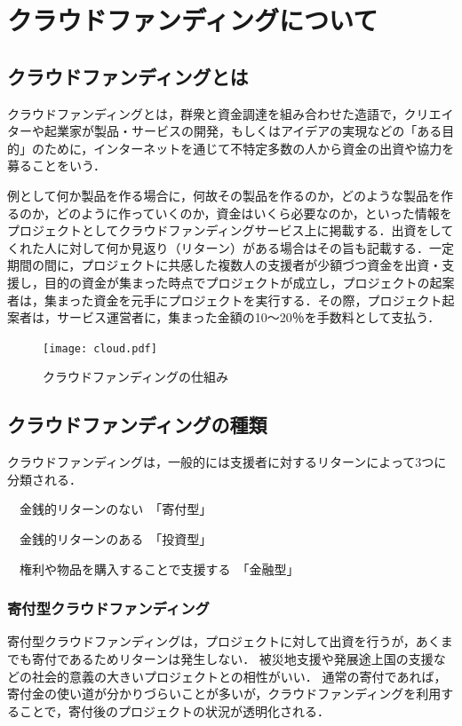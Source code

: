 \chapter{クラウドファンディングについて}
\section{クラウドファンディングとは}
クラウドファンディングとは\cite{wiki}，群衆と資金調達を組み合わせた造語で，クリエイターや起業家が製品・サービスの開発，もしくはアイデアの実現などの「ある目的」のために，インターネットを通じて不特定多数の人から資金の出資や協力を募ることをいう．

例として何か製品を作る場合に，何故その製品を作るのか，どのような製品を作るのか，どのように作っていくのか，資金はいくら必要なのか，といった情報をプロジェクトとしてクラウドファンディングサービス上に掲載する．出資をしてくれた人に対して何か見返り（リターン）がある場合はその旨も記載する．一定期間の間に，プロジェクトに共感した複数人の支援者が少額づつ資金を出資・支援し，目的の資金が集まった時点でプロジェクトが成立し，プロジェクトの起案者は，集まった資金を元手にプロジェクトを実行する．その際，プロジェクト起案者は，サービス運営者に，集まった金額の10〜20％を手数料として支払う．

\begin{figure}[htb]
\centering
\texttt{[image: cloud.pdf]}
\caption{クラウドファンディングの仕組み}\label{サンプル図}
\end{figure}

\section{クラウドファンディングの種類}
クラウドファンディングは，一般的には支援者に対するリターンによって3つに分類される\cite{shurui}．
\begin{description}
 \item　金銭的リターンのない　「寄付型」
 \item　金銭的リターンのある　「投資型」
 \item　権利や物品を購入することで支援する　「金融型」
\end{description}

\subsection{寄付型クラウドファンディング}
寄付型クラウドファンディングは，プロジェクトに対して出資を行うが，あくまでも寄付であるためリターンは発生しない．
被災地支援や発展途上国の支援などの社会的意義の大きいプロジェクトとの相性がいい．
通常の寄付であれば，寄付金の使い道が分かりづらいことが多いが，クラウドファンディングを利用することで，寄付後のプロジェクトの状況が透明化される．

